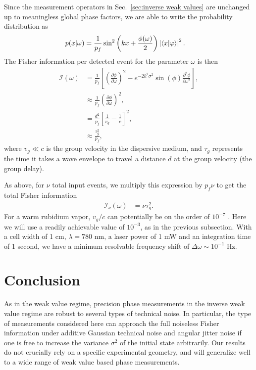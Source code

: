 Since the measurement operators in Sec.~\ref{sec:inverse weak values} are unchanged up to meaningless global phase factors, we are able to write the probability distribution as 
\begin{align}
	p(x|\omega) &= \frac{1}{p_f}\sin^2\left(kx + \frac{\phi(\omega)}{2}\right)\left|\langle x \vert \varphi \rangle\right|^2.
\end{align}
The Fisher information per detected event for the parameter $\omega$ is then
\begin{align}
	\nonumber \mathcal{I}(\omega) &= \frac{1}{p_f}\left[\left(\frac{\partial \phi}{\partial \omega}\right)^2 - e^{-2k^2\sigma^2}\sin(\phi) \frac{\partial^2 \phi}{\partial \omega^2}\right], \\
	\nonumber &\approx \frac{1}{p_f}\left(\frac{\partial \phi}{\partial \omega}\right)^2, \\
	\nonumber &= \frac{d^2}{p_f}\left[\frac{1}{v_g} - \frac{1}{c}\right]^2, \\
	&\approx \frac{\tau_g^2}{p_f},
\end{align}
where $v_g \ll c$ is the group velocity in the dispersive medium, and $\tau_g$ represents the time it takes a wave envelope to travel a distance $d$ at the group velocity (the group delay).  

As above, for $\nu$ total input events, we multiply this expression by $p_f \nu$ to get the total Fisher information
\begin{align}
	\mathcal{I}_\nu(\omega) &= \nu\tau_g^2.
\end{align}
For a warm rubidium vapor, $v_g/c$ can potentially be on the order of $10^{-7}$ \cite{Boyd2001}.  Here we will use a readily achievable value of $10^{-3}$, as in the previous subsection.  With a cell width of 1 cm, $\lambda = 780$ nm, a laser power of 1 mW and an integration time of 1 second, we have a minimum resolvable frequency shift of $\Delta \omega \sim 10^{-1}$ Hz. 

\section{Conclusion}
As in the weak value regime, precision phase measurements in the inverse weak value regime are robust to several types of technical noise.  In particular, the type of measurements considered here can approach the full noiseless Fisher information under additive Gaussian technical noise and angular jitter noise if one is free to increase the variance $\sigma^2$ of the initial state arbitrarily.  Our results do not crucially rely on a specific experimental geometry, and will generalize well to a wide range of weak value based phase measurements.

